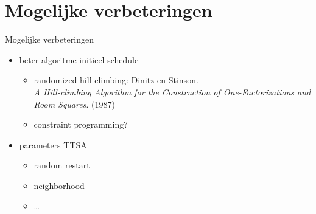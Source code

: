 \documentclass{beamer}
\begin{document}




\section{Mogelijke verbeteringen}
\begin{frame}{Mogelijke verbeteringen}
\begin{itemize}[<+->]
  \item beter algoritme initieel schedule 
\begin{itemize} 
\item randomized hill-climbing: Dinitz en Stinson. \\\emph{A Hill-climbing Algorithm for the Construction of One-Factorizations and Room Squares}. (1987)
\item constraint programming? 
\end{itemize}
  \item parameters TTSA
\begin{itemize}
  \item random restart
  \item neighborhood
  \item \ldots
\end{itemize}


\end{itemize}
 \end{frame}
\end{document}
